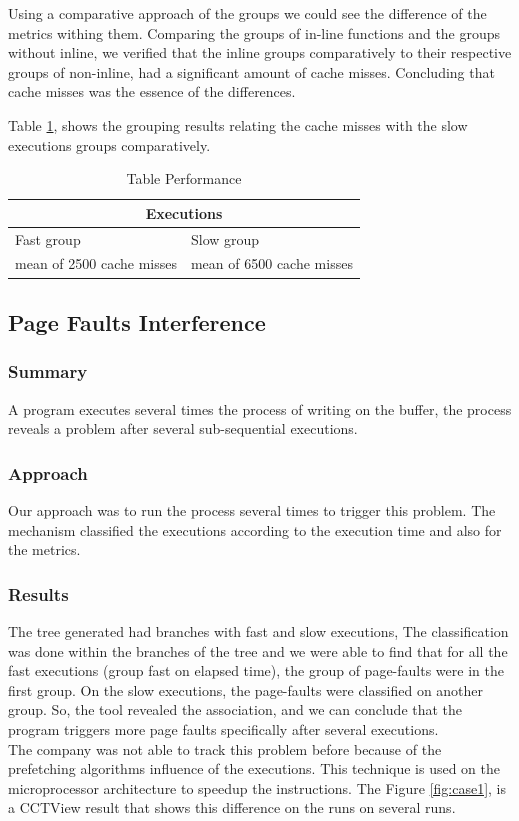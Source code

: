     Using a comparative approach of the groups we could see the difference of the metrics withing them. Comparing the groups of in-line functions and the groups without inline, we verified that the inline groups comparatively to their respective groups of non-inline, had a significant amount of cache misses. Concluding that cache misses was the essence of the differences.
    
    Table \ref{tab:table}, shows the grouping results relating the cache misses with the slow executions groups comparatively. 
    
\begin{table}[]
\centering
\caption{Table Performance}
\label{tab:table}
\begin{tabular}{ll}
\hline
\multicolumn{2}{c}{Executions}                        \\ \hline
Fast group                & Slow group                \\ \hline
mean of 2500 cache misses & mean of 6500 cache misses
\end{tabular}
\end{table}

\subsection{\textbf{Page Faults Interference}}
    \subsubsection{Summary}
    A program executes several times the process of writing on the buffer, the process reveals a problem after several sub-sequential executions.
    
\subsubsection{Approach}
    Our approach was to run the process several times to trigger this problem. The mechanism classified the executions according to the execution time and also for the metrics.
    
\subsubsection{Results}
     The tree generated had branches with fast and slow executions, 
     The classification was done within the branches of the tree and we were able to find that for all the fast executions (group fast on elapsed time), the group of page-faults were in the first group. On the slow executions, the page-faults were classified on another group. So, the tool revealed the association, and we can conclude that the program triggers more page faults specifically after several executions.\\
     The company was not able to track this problem before because of the prefetching algorithms influence of the executions. This technique is used on the microprocessor architecture to speedup the instructions. The Figure \ref{fig:case1}, is a CCTView result that shows this  difference on the runs on several runs.
    
